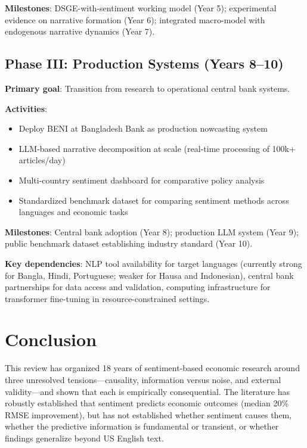 \documentclass[11pt]{article}
\begin{document}
\noindent\textbf{Milestones}: DSGE-with-sentiment working model (Year 5); experimental evidence on narrative formation (Year 6); integrated macro-model with endogenous narrative dynamics (Year 7).

\subsection*{Phase III: Production Systems (Years 8--10)}

\noindent\textbf{Primary goal}: Transition from research to operational central bank systems.

\noindent\textbf{Activities}:
\begin{itemize}
    \item Deploy BENI at Bangladesh Bank as production nowcasting system
    \item LLM-based narrative decomposition at scale (real-time processing of 100k+ articles/day)
    \item Multi-country sentiment dashboard for comparative policy analysis
    \item Standardized benchmark dataset for comparing sentiment methods across languages and economic tasks
\end{itemize}

\noindent\textbf{Milestones}: Central bank adoption (Year 8); production LLM system (Year 9); public benchmark dataset establishing industry standard (Year 10).

\noindent\textbf{Key dependencies}: NLP tool availability for target languages (currently strong for Bangla, Hindi, Portuguese; weaker for Hausa and Indonesian), central bank partnerships for data access and validation, computing infrastructure for transformer fine-tuning in resource-constrained settings.

\section{Conclusion}

This review has organized 18 years of sentiment-based economic research around three unresolved tensions---causality, information versus noise, and external validity---and shown that each is empirically consequential. The literature has robustly established that sentiment predicts economic outcomes (median 20\% RMSE improvement), but has not established whether sentiment causes them, whether the predictive information is fundamental or transient, or whether findings generalize beyond US English text.
\end{document}
